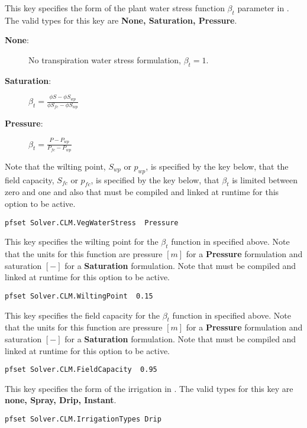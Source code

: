 {This key specifies the form of the plant water stress function $\beta_t$ parameter in .   The valid types for this key are {\bf None, Saturation, Pressure}. \begin{description}
\item[{\bf None}: ] No transpiration water stress formulation, $\beta_t=1$.
\item[{\bf Saturation}: ] $\beta_t=\frac{\phi S -\phi S_{wp}}{\phi S_{fc}-\phi S_{wp}}$
\item[{\bf Pressure}: ] $\beta_t=\frac{P - P_{wp}}{P_{fc}-P_{wp}}$
\end{description}
Note that the wilting point, $S_{wp}$ or $p_{wp}$, is specified by the key  below, that the field capacity, $S_{fc}$ or $p_{fc}$, is specified by the key  below, that $\beta_t$ is limited between zero and one and also that  must be compiled and linked at runtime for this option to be active.
}
\begin{display}\begin{verbatim}
pfset Solver.CLM.VegWaterStress  Pressure
\end{verbatim}\end{display}

{This key specifies the wilting point for the $\beta_t$ function in  specified above. Note that the units for this function are pressure $[m]$ for a {\bf Pressure} formulation and saturation $[-]$ for a {\bf Saturation} formulation. Note that  must be compiled and linked at runtime for this option to be active.
}
\begin{display}\begin{verbatim}
pfset Solver.CLM.WiltingPoint  0.15
\end{verbatim}\end{display}

{This key specifies the field capacity for the $\beta_t$ function in  specified above. Note that the units for this function are pressure $[m]$ for a {\bf Pressure} formulation and saturation $[-]$ for a {\bf Saturation} formulation. Note that  must be compiled and linked at runtime for this option to be active.
}
\begin{display}\begin{verbatim}
pfset Solver.CLM.FieldCapacity  0.95
\end{verbatim}\end{display}
{This key specifies the form of the irrigation in .  The valid types for this key are {\bf none, Spray, Drip, Instant}.
} 
\begin{display}\begin{verbatim}
pfset Solver.CLM.IrrigationTypes Drip
\end{verbatim}\end{display}

